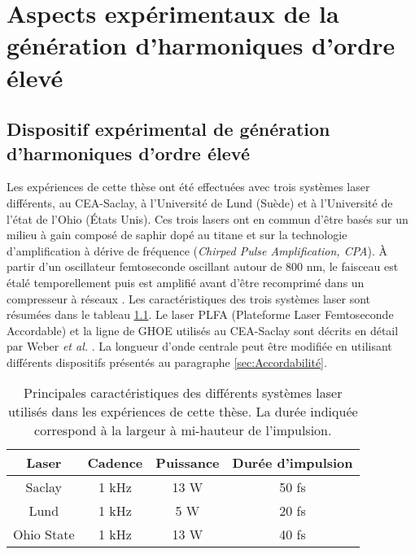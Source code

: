 

\chapter{Aspects expérimentaux de la génération d'harmoniques d'ordre élevé}
\label{chap:ExpHHG}
\section{Dispositif expérimental de génération d'harmoniques d'ordre élevé}
\label{sec:HHG}
Les expériences de cette thèse ont été effectuées avec trois systèmes laser différents, au CEA-Saclay, à l'Université de Lund (Suède) et à l'Université de l'état de l'Ohio (\'{E}tats Unis). Ces trois lasers ont en commun d'être basés sur un milieu à gain composé de saphir dopé au titane et sur la technologie d'amplification à dérive de fréquence (\textit{Chirped Pulse Amplification, CPA}). \`{A} partir d'un oscillateur femtoseconde oscillant autour de 800 nm, le faisceau est étalé temporellement puis est amplifié avant d'être recomprimé dans un compresseur à réseaux . Les caractéristiques des trois systèmes laser sont résumées dans le tableau \ref{tab:Lasers}. Le laser PLFA (Plateforme Laser Femtoseconde Accordable) et la ligne de GHOE utilisés au CEA-Saclay sont décrits en détail par Weber \textit{et al.} . La longueur d'onde centrale peut être modifiée en utilisant différents dispositifs présentés au paragraphe \ref{sec:Accordabilité}.

\begin{table}[ht]
\begin{center}
\begin{tabular}{|c||c|c|c|}
\hline
Laser & Cadence & Puissance & Durée d'impulsion \\
\hline
Saclay & 1 kHz & 13 W & 50 fs \\
\hline
Lund & 1 kHz & 5 W & 20 fs  \\
\hline
Ohio State & 1 kHz & 13 W & 40 fs\\
\hline
\end{tabular}
\end{center}
\caption{Principales caractéristiques des différents systèmes laser utilisés dans les expériences de cette thèse. La durée indiquée correspond à la largeur à mi-hauteur de l'impulsion.}
\label{tab:Lasers}
\end{table}

